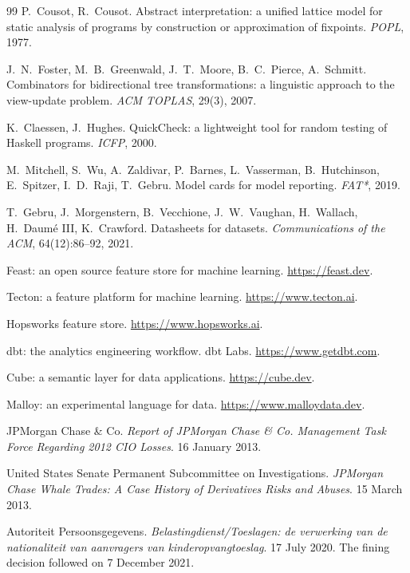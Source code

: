 \documentclass[11pt,a4paper]{article}
\renewcommand{\_}{\oldunderscore\allowbreak}
\theoremstyle{plain}
\theoremstyle{definition}
\theoremstyle{definition}
\theoremstyle{remark}
\begin{document}
\begin{thebibliography}{99}
 P.~Cousot, R.~Cousot. Abstract interpretation: a unified lattice model for static
analysis of programs by construction or approximation of fixpoints. \emph{POPL}, 1977.

 J.~N.~Foster, M.~B.~Greenwald, J.~T.~Moore, B.~C.~Pierce, A.~Schmitt.
Combinators for bidirectional tree transformations: a linguistic approach to the view-update problem.
\emph{ACM TOPLAS}, 29(3), 2007.

 K.~Claessen, J.~Hughes. QuickCheck: a lightweight tool for random testing of Haskell
programs. \emph{ICFP}, 2000.

 M.~Mitchell, S.~Wu, A.~Zaldivar, P.~Barnes, L.~Vasserman, B.~Hutchinson,
E.~Spitzer, I.~D.~Raji, T.~Gebru. Model cards for model reporting. \emph{FAT*}, 2019.

 T.~Gebru, J.~Morgenstern, B.~Vecchione, J.~W.~Vaughan, H.~Wallach, H.~Daum\'e III,
K.~Crawford. Datasheets for datasets. \emph{Communications of the ACM}, 64(12):86--92, 2021.

 Feast: an open source feature store for machine learning. \url{https://feast.dev}.

 Tecton: a feature platform for machine learning. \url{https://www.tecton.ai}.

 Hopsworks feature store. \url{https://www.hopsworks.ai}.

 dbt: the analytics engineering workflow. dbt Labs. \url{https://www.getdbt.com}.

 Cube: a semantic layer for data applications. \url{https://cube.dev}.

 Malloy: an experimental language for data. \url{https://www.malloydata.dev}.

 JPMorgan Chase \& Co. \emph{Report of JPMorgan Chase \& Co. Management Task
Force Regarding 2012 CIO Losses}. 16 January 2013.

 United States Senate Permanent Subcommittee on Investigations. \emph{JPMorgan Chase
Whale Trades: A Case History of Derivatives Risks and Abuses}. 15 March 2013.

 Autoriteit Persoonsgegevens. \emph{Belastingdienst/Toeslagen: de verwerking
van de nationaliteit van aanvragers van kinderopvangtoeslag}. 17 July 2020. The fining decision followed
on 7 December 2021.


\end{thebibliography}
\end{document}
